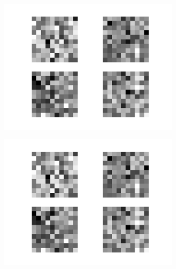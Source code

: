 \begin{figure}[h!]
	\centering
	\begin{subfigure}[t]{.19\textwidth}
  		\centering
  		\includegraphics[width=\linewidth]{imgs/inspect/00010.png}
  		\label{fig:sub1}
	\end{subfigure}%
	\begin{subfigure}[t]{.19\textwidth}
  		\centering
  		\includegraphics[width=\linewidth]{imgs/inspect/00011.png}
  		\label{fig:sub1}
	\end{subfigure}%
	\begin{subfigure}[t]{.19\textwidth}
  		\centering

\end{subfigure}
\end{figure}
